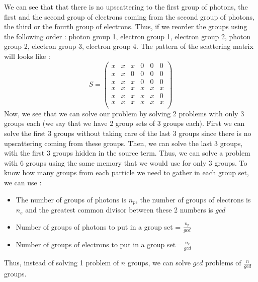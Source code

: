 We can see that that there is no upscattering to the first group of photons, the
first and the second group of electrons coming from the second group of photons,
the third or the fourth group of electrons. Thus, if we reorder the groups using the
following order : photon group 1, electron group 1, electron group 2, photon
group 2, electron group 3, electron group 4. The pattern of the scattering matrix
will looks like :
\begin{equation}
S =
\begin{pmatrix}
x & x & x & 0 & 0 & 0\\
x & x & 0 & 0 & 0 & 0\\
x & x & x & 0 & 0 & 0\\
x & x & x & x & x & x\\
x & x & x & x & x & 0\\
x & x & x & x & x & x\\
\end{pmatrix}
\end{equation}
Now, we see that we can solve our problem by solving 2 problems with only 3
groups each (we say that we have 2 group sets of 3 groups each). First we can solve 
the first 3 groups without taking care of the last 3 groups since there is no 
upscattering coming from these groups. Then, we can solve the last 3 groups, with 
the first 3 groups hidden in the source term. Thus, we can solve a problem with 6 
groups using the same memory that we would use for only 3 groups. To know how many 
groups from each particle we need to gather in each group set, we can use :
\begin{itemize}
\item The number of groups of photons is $n_p$, the number of groups of electrons 
is $n_e$ and the greatest common divisor between these 2 numbers is $gcd$
\item Number of groups of photons to put in a group set = $\frac{n_p}{gcd}$
\item Number of groups of electrons to put in a group set= $\frac{n_e}{gcd}$
\end{itemize}
Thus, instead of solving 1 problem of $n$ groups, we can solve $gcd$ problems
of $\frac{n}{gcd}$ groups.


